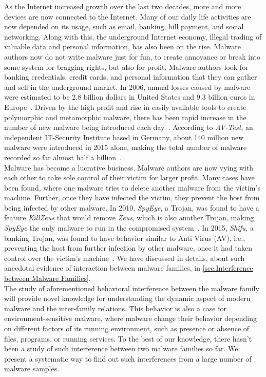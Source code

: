 As the Internet increased growth over the last two decades, more and more devices are now connected to the Internet.
Many of our daily life activities are now depended on its usage, such as email, banking, bill payment, and social networking.
Along with this, the underground Internet economy, illegal trading of valuable data and personal information, has also been on the rise.
Malware authors now do not write malware just for fun, to create annoyance or break into some system for bragging rights, but also for profit.
Malware authors look for banking credentials, credit cards, and personal information that they can gather and sell in the underground market.
In 2006, annual losses caused by malware were estimated to be 2.8 billion dollars in United States and 9.3 billion euros in Europe~\cite[]{moore2009economics}.
Driven by the high profit and rise in easily available tools to create polymorphic and metamorphic malware, there has been rapid increase in the number of new malware being introduced each day~\cite[]{tian}.
According to \emph{AV-Test}, an independent IT-Security Institute based in Germany, about 140 million new malware were introduced in 2015 alone, making the total number of malware recorded so far almost half a billion~\cite[]{avtest}.
\\

Malware has become a lucrative business.
Malware authors are now vying with each other to take sole control of their victim for larger profit.
Many cases have been found, where one malware tries to delete another malware from the victim's machine.
Further, once they have infected the victim, they prevent the host from being infected by other malware.
In 2010, \emph{SpyEye}, a Trojan, was found to have a feature \emph{KillZeus} that would remove \emph{Zeus}, which is also another Trojan, making \emph{SpyEye} the only malware to run in the compromised system~\cite[]{sanszeus}.
In 2015, \emph{Shifu}, a banking Trojan, was found to have behavior similar to Anti Virus (AV), i.e., preventing the host from further infection by other malware, once it had taken control over the victim's machine~\cite[]{secintelshifu}.
We have discussed in details, about such anecdotal evidence of interaction between malware families, in \autoref{sec:Interference between Malware Families}.\\

The study of aforementioned behavioral interference between the malware family will provide novel knowledge for understanding the dynamic aspect of modern malware and the inter-family relations.
This behavior is also a case for environment-sensitive malware, where malware change their behavior depending on different factors of its running environment, such as presence or absence of files, programs, or running services.
To the best of our knowledge, there hasn't been a study of such interference between two malware families so far.
We present a systematic way to find out such interferences from a large number of malware samples.\\

